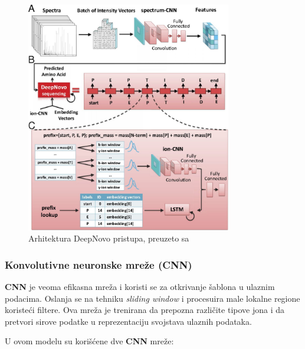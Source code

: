 \documentclass[12pt,oneside]{memoir}
\begin{document}
\begin{figure}[H]
\centering
\includegraphics[width=0.8\textwidth]{images/deep_novo_architecture.jpeg}
\caption{Arhitektura DeepNovo pristupa, preuzeto sa \cite{deepnovo}}
\label{fig:arhitektura}
\end{figure}

\subsubsection{Konvolutivne neuronske mreže (CNN)}
\textbf{CNN} je veoma efikasna mreža i koristi se za otkrivanje šablona u ulaznim podacima. Oslanja se na tehniku \emph{sliding window} i procesuira male lokalne regione koristeći filtere. Ova mreža je trenirana da prepozna različite tipove jona i da pretvori sirove podatke u reprezentaciju svojstava ulaznih podataka.

U ovom modelu su korišćene dve \textbf{CNN} mreže:
\end{document}
